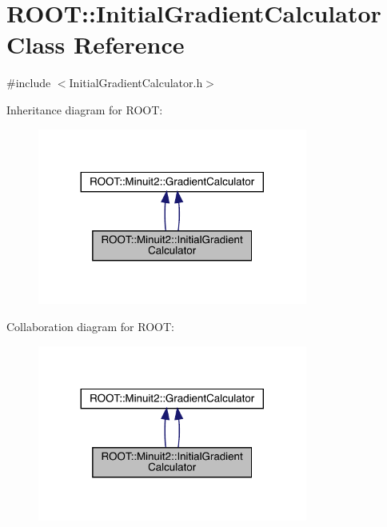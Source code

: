\hypertarget{classROOT_1_1Minuit2_1_1InitialGradientCalculator}{}\section{R\+O\+OT\+:\+:Initial\+Gradient\+Calculator Class Reference}
\label{classROOT_1_1Minuit2_1_1InitialGradientCalculator}


{\ttfamily \#include $<$Initial\+Gradient\+Calculator.\+h$>$}



Inheritance diagram for R\+O\+OT\+:\nopagebreak
\begin{figure}[H]
\begin{center}
\leavevmode
\includegraphics[width=251pt]{d6/dbe/classROOT_1_1Minuit2_1_1InitialGradientCalculator__inherit__graph}
\end{center}
\end{figure}


Collaboration diagram for R\+O\+OT\+:\nopagebreak
\begin{figure}[H]
\begin{center}
\leavevmode
\includegraphics[width=251pt]{dd/d03/classROOT_1_1Minuit2_1_1InitialGradientCalculator__coll__graph}
\end{center}
\end{figure}
